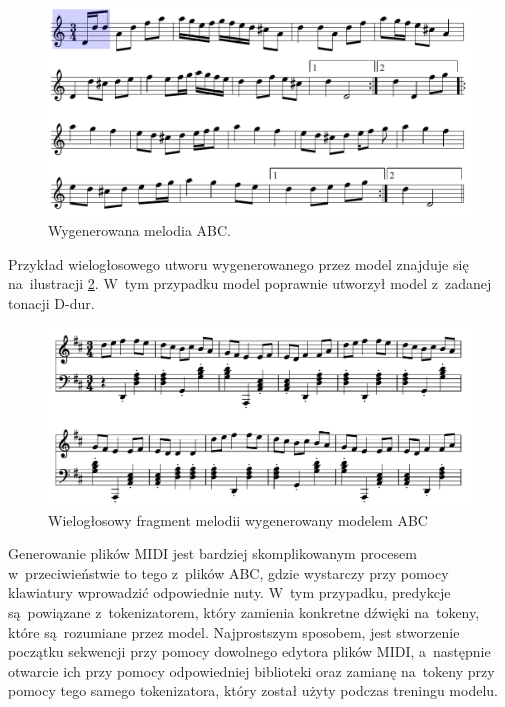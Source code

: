 \documentclass[data-science]{agh-wi} %
\begin{document}
\begin{figure}[ht!]
    \begin{center}
        \includegraphics[width=0.9\linewidth]{./img/abc_gen_nice1.pdf}
    \end{center}
    \caption{Wygenerowana melodia ABC.}\label{fig:music_gen1}
\end{figure}

Przykład wielogłosowego utworu wygenerowanego przez model znajduje się na~ilustracji \ref*{fig:vvv_abc}. W~tym przypadku model poprawnie utworzył model z~zadanej tonacji D-dur.

\begin{figure}[ht!]
    \centering
    \includegraphics[width=0.9\linewidth]{./img/example.pdf}
    \caption{Wielogłosowy fragment melodii wygenerowany modelem ABC}\label{fig:vvv_abc}
\end{figure}

Generowanie plików MIDI jest bardziej skomplikowanym procesem w~przeciwieństwie to tego z~plików ABC, gdzie wystarczy przy pomocy klawiatury wprowadzić odpowiednie nuty. W~tym przypadku, predykcje są~powiązane z~tokenizatorem, który zamienia konkretne dźwięki na~tokeny, które są~rozumiane przez model. Najprostszym sposobem, jest stworzenie początku sekwencji przy pomocy dowolnego edytora plików MIDI, a~następnie otwarcie ich przy pomocy odpowiedniej biblioteki oraz zamianę na~tokeny przy pomocy tego samego tokenizatora, który został użyty podczas treningu modelu.
\end{document}
